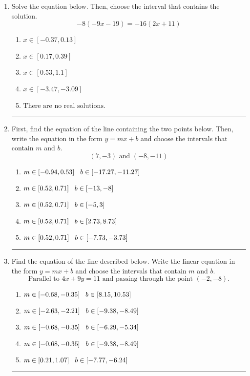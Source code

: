 \documentclass[14pt]{extbook}
\newcommand{\litem}[1]{\item#1\hspace*{-1cm}\rule{\textwidth}{0.4pt}}
\begin{document}
\begin{enumerate}
{\begin{enumerate}[label=\Alph*.]
\end{enumerate} }
\litem{
Solve the equation below. Then, choose the interval that contains the solution.\[ -8(-9x -19) = -16(2x + 11) \]\begin{enumerate}[label=\Alph*.]
\item \( x \in [-0.37, 0.13] \)
\item \( x \in [0.17, 0.39] \)
\item \( x \in [0.53, 1.1] \)
\item \( x \in [-3.47, -3.09] \)
\item \( \text{There are no real solutions.} \)

\end{enumerate} }
\litem{
First, find the equation of the line containing the two points below. Then, write the equation in the form $ y=mx+b $ and choose the intervals that contain $m$ and $b$.\[ (7, -3) \text{ and } (-8, -11) \]\begin{enumerate}[label=\Alph*.]
\item \( m \in [-0.94, 0.53] \hspace*{3mm} b \in [-17.27, -11.27] \)
\item \( m \in [0.52, 0.71] \hspace*{3mm} b \in [-13, -8] \)
\item \( m \in [0.52, 0.71] \hspace*{3mm} b \in [-5, 3] \)
\item \( m \in [0.52, 0.71] \hspace*{3mm} b \in [2.73, 8.73] \)
\item \( m \in [0.52, 0.71] \hspace*{3mm} b \in [-7.73, -3.73] \)

\end{enumerate} }
\litem{
Find the equation of the line described below. Write the linear equation in the form $ y=mx+b $ and choose the intervals that contain $m$ and $b$.\[ \text{Parallel to } 4 x + 9 y = 11 \text{ and passing through the point } (-2, -8). \]\begin{enumerate}[label=\Alph*.]
\item \( m \in [-0.68, -0.35] \hspace*{3mm} b \in [8.15, 10.53] \)
\item \( m \in [-2.63, -2.21] \hspace*{3mm} b \in [-9.38, -8.49] \)
\item \( m \in [-0.68, -0.35] \hspace*{3mm} b \in [-6.29, -5.34] \)
\item \( m \in [-0.68, -0.35] \hspace*{3mm} b \in [-9.38, -8.49] \)
\item \( m \in [0.21, 1.07] \hspace*{3mm} b \in [-7.77, -6.24] \)


\end{enumerate}}
\end{enumerate}
\end{document}
